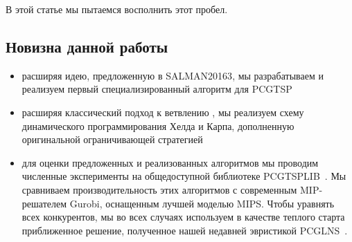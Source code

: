 В этой статье мы пытаемся восполнить этот пробел.

\subsection{Новизна данной работы}
\begin{itemize}
	\item
	расширяя идею, предложенную в {SALMAN20163}, 
	мы разрабатываем и реализуем первый специализированный алгоритм для PCGTSP
	\item
	расширяя классический подход к ветвлению \cite{MorinMarsten1976}, 
	мы реализуем схему динамического программирования Хелда и Карпа, 
	дополненную оригинальной ограничивающей стратегией
	\item
	для оценки предложенных и реализованных алгоритмов 
	мы проводим численные эксперименты на общедоступной библиотеке PCGTSPLIB~\cite{SALMAN2020163}. 
	Мы сравниваем производительность этих алгоритмов с современным MIP-решателем Gurobi, 
	оснащенным лучшей моделью MIPS. 
	Чтобы уравнять всех конкурентов, 
	мы во всех случаях используем в качестве теплого старта приближенное решение, 
	полученное нашей недавней эвристикой PCGLNS~\cite{PCGLNS}.
\end{itemize}  
